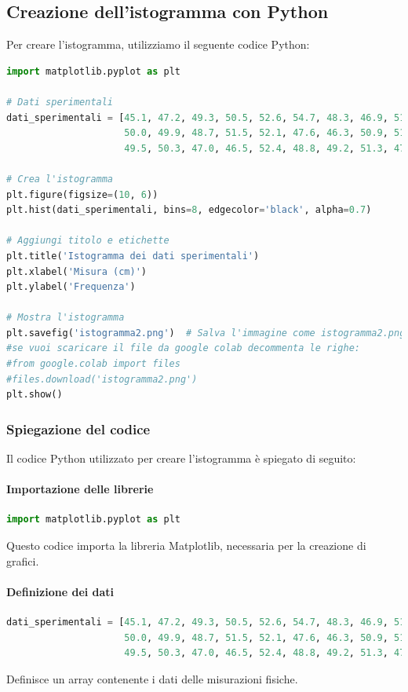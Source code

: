 \subsection{Creazione dell'istogramma con Python}
Per creare l'istogramma, utilizziamo il seguente codice Python:

\begin{lstlisting}[language=Python, caption=Codice Python per creare l'istogramma]
import matplotlib.pyplot as plt

# Dati sperimentali
dati_sperimentali = [45.1, 47.2, 49.3, 50.5, 52.6, 54.7, 48.3, 46.9, 51.2, 53.8, 
                     50.0, 49.9, 48.7, 51.5, 52.1, 47.6, 46.3, 50.9, 51.8, 48.0, 
                     49.5, 50.3, 47.0, 46.5, 52.4, 48.8, 49.2, 51.3, 47.8, 50.7]

# Crea l'istogramma
plt.figure(figsize=(10, 6))
plt.hist(dati_sperimentali, bins=8, edgecolor='black', alpha=0.7)

# Aggiungi titolo e etichette
plt.title('Istogramma dei dati sperimentali')
plt.xlabel('Misura (cm)')
plt.ylabel('Frequenza')

# Mostra l'istogramma
plt.savefig('istogramma2.png')  # Salva l'immagine come istogramma2.png
#se vuoi scaricare il file da google colab decommenta le righe:
#from google.colab import files
#files.download('istogramma2.png')
plt.show()
\end{lstlisting}

\subsubsection{Spiegazione del codice}
Il codice Python utilizzato per creare l'istogramma è spiegato di seguito:

\paragraph{Importazione delle librerie}
\begin{lstlisting}[language=Python, caption=Importazione delle librerie]
import matplotlib.pyplot as plt
\end{lstlisting}
Questo codice importa la libreria Matplotlib, necessaria per la creazione di grafici.

\paragraph{Definizione dei dati}
\begin{lstlisting}[language=Python, caption=Definizione dei dati]
dati_sperimentali = [45.1, 47.2, 49.3, 50.5, 52.6, 54.7, 48.3, 46.9, 51.2, 53.8, 
                     50.0, 49.9, 48.7, 51.5, 52.1, 47.6, 46.3, 50.9, 51.8, 48.0, 
                     49.5, 50.3, 47.0, 46.5, 52.4, 48.8, 49.2, 51.3, 47.8, 50.7]
\end{lstlisting}
Definisce un array contenente i dati delle misurazioni fisiche.


